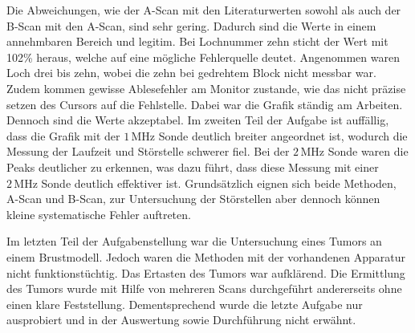 \begin{flushleft}
    Die Abweichungen, wie der A-Scan mit den Literaturwerten sowohl als auch der B-Scan mit den A-Scan, sind sehr gering.
    Dadurch sind die Werte in einem annehmbaren Bereich und legitim.
    Bei Lochnummer zehn sticht der Wert mit 102\% heraus, welche auf eine mögliche Fehlerquelle deutet.
    Angenommen waren Loch drei bis zehn, wobei die zehn bei gedrehtem Block nicht messbar war. 
    Zudem kommen gewisse Ablesefehler am Monitor zustande, wie das nicht präzise setzen des Cursors auf die Fehlstelle.
    Dabei war die Grafik ständig am Arbeiten.
    Dennoch sind die Werte akzeptabel.
    Im zweiten Teil der Aufgabe ist auffällig, dass die Grafik mit der $ 1\,\unit{\mega\hertz} $ Sonde deutlich breiter angeordnet ist, wodurch die Messung der Laufzeit und Störstelle schwerer fiel.
    Bei der $ 2\,\unit{\mega\hertz} $ Sonde waren die Peaks deutlicher zu erkennen, was dazu führt, dass diese Messung mit einer $ 2\,\unit{\mega\hertz} $ Sonde deutlich effektiver ist.
    Grundsätzlich eignen sich beide Methoden, A-Scan und B-Scan, zur Untersuchung der Störstellen aber dennoch können kleine systematische Fehler auftreten.
\end{flushleft}

\begin{flushleft}
    Im letzten Teil der Aufgabenstellung war die Untersuchung eines Tumors an einem Brustmodell. 
    Jedoch waren die Methoden mit der vorhandenen Apparatur nicht funktionstüchtig. 
    Das Ertasten des Tumors war aufklärend. Die Ermittlung des Tumors wurde mit Hilfe von mehreren Scans durchgeführt andererseits ohne einen klare Feststellung. 
    Dementsprechend wurde die letzte Aufgabe nur ausprobiert und in der Auswertung sowie Durchführung nicht erwähnt.
\end{flushleft}